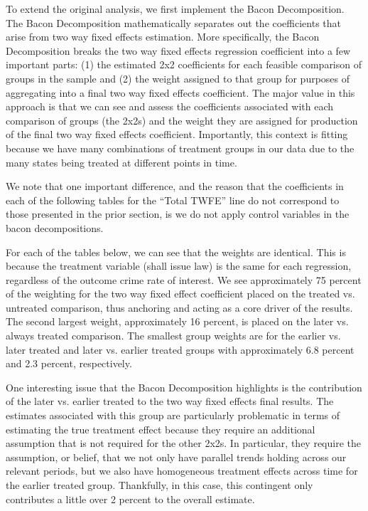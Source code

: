 \documentclass{article}
\begin{document}
To extend the original analysis, we first implement the Bacon Decomposition. The Bacon Decomposition mathematically separates out the coefficients that arise from two way fixed effects estimation. More specifically, the Bacon Decomposition breaks the two way fixed effects regression coefficient into a few important parts: (1) the estimated 2x2 coefficients for each feasible comparison of groups in the sample and (2) the weight assigned to that group for purposes of aggregating into a final two way fixed effects coefficient. The major value in this approach is that we can see and assess the coefficients associated with each comparison of groups (the 2x2s) and the weight they are assigned for production of the final two way fixed effects coefficient. Importantly, this context is fitting because we have many combinations of treatment groups in our data due to the many states being treated at different points in time.

We note that one important difference, and the reason that the coefficients in each of the following tables for the ``Total TWFE'' line do not correspond to those presented in the prior section, is we do not apply control variables in the bacon decompositions.

For each of the tables below, we can see that the weights are identical. This is because the treatment variable (shall issue law) is the same for each regression, regardless of the outcome crime rate of interest. We see approximately 75 percent of the weighting for the two way fixed effect coefficient placed on the treated vs. untreated comparison, thus anchoring and acting as a core driver of the results. The second largest weight, approximately 16 percent, is placed on the later vs. always treated comparison. The smallest group weights are for the earlier vs. later treated and later vs. earlier treated groups with approximately 6.8 percent and 2.3 percent, respectively. 

One interesting issue that the Bacon Decomposition highlights is the contribution of the later vs. earlier treated to the two way fixed effects final results. The estimates associated with this group are particularly problematic in terms of estimating the true treatment effect because they require an additional assumption that is not required for the other 2x2s. In particular, they require the assumption, or belief, that we not only have parallel trends holding across our relevant periods, but we also have homogeneous treatment effects across time for the earlier treated group. Thankfully, in this case, this contingent only contributes a little over 2 percent to the overall estimate.
\end{document}
